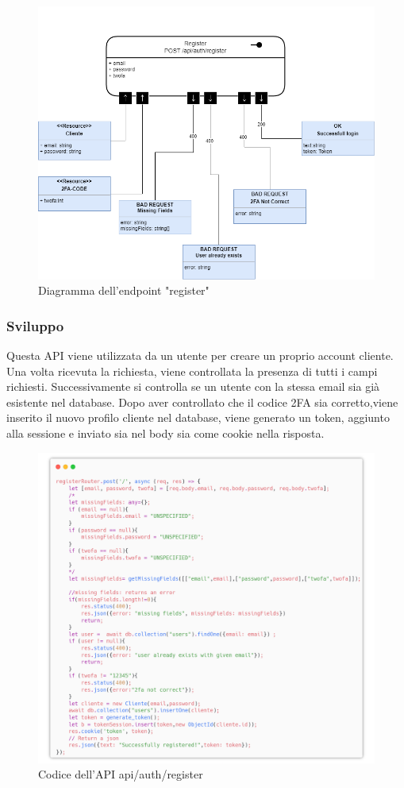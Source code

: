 \documentclass{report}
\begin{document}
\begin{figure}[H]
	\centering\includegraphics[width=1\textwidth]{images/microservizio-autenticazione/diagrams/diagramma_register.drawio.png}
	\caption{Diagramma dell'endpoint "register"}
\end{figure}
\subsubsection*{Sviluppo}
Questa API viene utilizzata da un utente per creare un proprio account cliente.
Una volta ricevuta la richiesta, viene controllata la presenza di tutti i campi richiesti.
Successivamente si controlla se un utente con la stessa email sia già esistente nel database.
Dopo aver controllato che il codice 2FA sia corretto,viene inserito il nuovo profilo cliente nel database, viene generato un token, aggiunto alla sessione e inviato sia nel body sia come cookie nella risposta.


\begin{figure}[H]
	\centering\includegraphics[width=1\textwidth]{images/microservizio-autenticazione/register-carbon.png}
	Codice dell'API api/auth/register
\end{figure}
\end{document}

